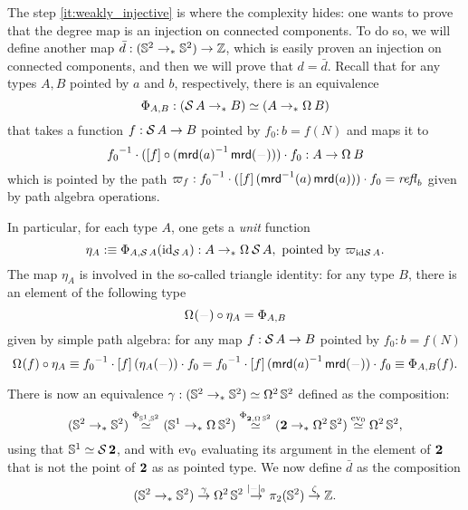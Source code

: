 \documentclass[english,a4]{article}
\renewcommand{\ap}[1]{\left[{#1}\right]}
\newcommand{\ptdto}{\to_\ast}%
\newcommand{\settrunc}[1]{\trunc{#1}_0}
\begin{document}
The step \ref{it:weakly_injective} 
is where the complexity hides: one wants to prove that the degree
map is an injection on connected components. To do so, we will define
another map $\bar d: (\Sp \ptdto \Sp) \to \ZZ$, which is easily proven an
injection on connected components, and then we will prove that $d = \bar d$.
Recall that for any types $A,B$ pointed by $a$ and $b$,
respectively, there is an equivalence
\begin{displaymath}
  \Phi_{A,B}: (\susp A \ptdto B) \weq (A \ptdto \loopspace \null B) 
\end{displaymath}
that takes a function $f:\operatorname{\mathcal S} A \to B$ pointed by $f_0:b=f(N)$ and maps it to 
\begin{displaymath}
  \inv {f_0}\cdot (\ap f\circ (\inv{\mrd(a)}\mrd(\blank)))\cdot f_0 : A \to \loopspace\null B
\end{displaymath}
which is pointed by the path $\varpi_{f}:\inv {f_0} \cdot (\ap f (\inv
\mrd(a)\mrd(a))) \cdot f_0 = \refl{b}$ given by path algebra operations.

In particular, for each type $A$, one gets a {\em unit} function 
\begin{displaymath}
  \eta_A \defequi \Phi_{A,\susp A}(\id_{\susp A}): A \ptdto \loopspace\null\susp A,
 \text{ pointed by $\varpi_{\id{\susp A}}$}.
\end{displaymath}
The map $\eta_A$ is involved in the so-called triangle identity: for any type $B$,
there is an element of the following type
\begin{equation}
  \loopspace\null(\blank) \circ \eta_A = \Phi_{A,B}
  \label{eq:triangle-identity-unit}
\end{equation}
given by simple path algebra: for any map $f:\operatorname{\mathcal S} A \to B$ pointed by $f_0:b=f(N)$
\begin{displaymath}
  \loopspace\null(f) \circ \eta_A \jdeq \inv {f_0} \cdot \ap f (\eta_A(\blank)) \cdot f_0 
  = \inv {f_0} \cdot \ap f (\inv{\mrd(a)}\mrd(\blank)) \cdot f_0 \jdeq \Phi_{A,B}(f). 
\end{displaymath}

There is now an equivalence $\gamma:(\Sp \ptdto \Sp) \weq \loopspace 2 \Sp$ defined as
the composition:
\begin{displaymath}
  (\Sp \ptdto \Sp) \stackrel{\Phi_{\Sc,\Sp}}\weq 
  (\Sc \ptdto\loopspace\null \Sp) \stackrel{\Phi_{\bn 2,\loopspace\null\Sp}}\weq 
  (\bn 2\ptdto\loopspace 2 \Sp) \stackrel{\ev_0}\weq 
  \loopspace 2 \Sp,
\end{displaymath}
using that ${{\mathbb S^{1}}} \simeq \operatorname{\mathcal S}{\mathbf{2}}$, and with $\mathrm{ev}_0$ evaluating its argument 
in the element of $\mathbf{2}$ that is not the point of $\mathbf{2}$ as as pointed type.					
We now define $\bar d$ as the composition
\begin{displaymath}
  (\Sp \ptdto \Sp) \stackrel \gamma \to \loopspace 2 \Sp \stackrel {\settrunc\blank} \to 
  \pi_2(\Sp) \stackrel \zeta \to \ZZ.
\end{displaymath}
\end{document}

